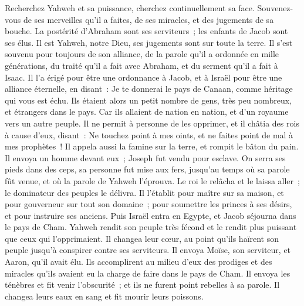 \begin{multicols}{2}
Recherchez Yahweh et sa puissance, cherchez continuellement sa face.
Souvenez-vous de ses merveilles qu'il a faites, de ses miracles, et des jugements de sa bouche.
La postérité d'Abraham sont ses serviteurs~; les enfants de Jacob sont ses élus.
Il est Yahweh, notre Dieu, ses jugements sont sur toute la terre.
Il s'est souvenu pour toujours de son alliance, de la parole qu'il a ordonnée en mille générations,
du traité qu'il a fait avec Abraham, et du serment qu'il a fait à Isaac.
Il l'a érigé pour être une ordonnance à Jacob, et à Israël pour être une alliance éternelle,
en disant~: Je te donnerai le pays de Canaan, comme héritage qui vous est échu.
Ils étaient alors un petit nombre de gens, très peu nombreux, et étrangers dans le pays.
Car ils allaient de nation en nation, et d'un royaume vers un autre peuple.
Il ne permit à personne de les opprimer, et il châtia des rois à cause d'eux,
disant~: Ne touchez point à mes oints, et ne faites point de mal à mes prophètes~!
Il appela aussi la famine sur la terre, et rompit le bâton du pain.
Il envoya un homme devant eux~; Joseph fut vendu pour esclave.
On serra ses pieds dans des ceps, sa personne fut mise aux fers,
jusqu'au temps où sa parole fût venue, et où la parole de Yahweh l'éprouva.
Le roi le relâcha et le laissa aller~; le dominateur des peuples le délivra.
Il l'établit pour maître sur sa maison, et pour gouverneur sur tout son domaine~;
pour soumettre les princes à ses désirs, et pour instruire ses anciens.
Puis Israël entra en Egypte, et Jacob séjourna dans le pays de Cham.
Yahweh rendit son peuple très fécond et le rendit plus puissant que ceux qui l'opprimaient.
Il changea leur cœur, au point qu'ils haïrent son peuple jusqu'à conspirer contre ses serviteurs.
Il envoya Moïse, son serviteur, et Aaron, qu'il avait élu.
Ils accomplirent au milieu d'eux des prodiges et des miracles qu'ils avaient eu la charge de faire dans le pays de Cham.
Il envoya les ténèbres et fit venir l'obscurité~; et ils ne furent point rebelles à sa parole.
Il changea leurs eaux en sang et fit mourir leurs poissons.

\end{multicols}
